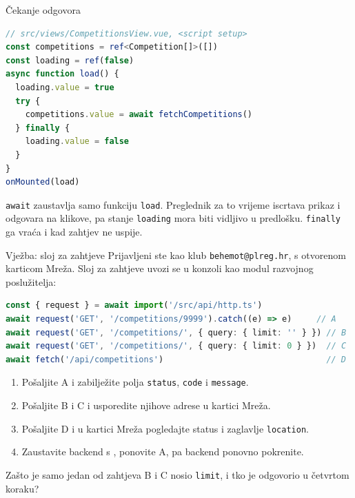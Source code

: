 \begin{frame}[fragile]{Čekanje odgovora}
\begin{lstlisting}[language=typescript]
// src/views/CompetitionsView.vue, <script setup>
const competitions = ref<Competition[]>([])
const loading = ref(false)
async function load() {
  loading.value = true
  try {
    competitions.value = await fetchCompetitions()
  } finally {
    loading.value = false
  }
}
onMounted(load)
\end{lstlisting}

\vspace{0.3em}
\texttt{await} zaustavlja samo funkciju \texttt{load}. Preglednik za to vrijeme iscrtava prikaz i odgovara na klikove, pa stanje \texttt{loading} mora biti vidljivo u predlošku. \texttt{finally} ga vraća i kad zahtjev ne uspije.
\end{frame}

\begin{frame}[fragile]{Vježba: sloj za zahtjeve}
Prijavljeni ste kao klub \texttt{behemot@plreg.hr}, s otvorenom karticom Mreža. Sloj za zahtjeve uvozi se u konzoli kao modul razvojnog poslužitelja:

\begin{lstlisting}[language=typescript]
const { request } = await import('/src/api/http.ts')
await request('GET', '/competitions/9999').catch((e) => e)     // A
await request('GET', '/competitions/', { query: { limit: '' } }) // B
await request('GET', '/competitions/', { query: { limit: 0 } })  // C
await fetch('/api/competitions')                                 // D
\end{lstlisting}

\begin{enumerate}
  \itemsep0.15em
  \item Pošaljite A i zabilježite polja \texttt{status}, \texttt{code} i \texttt{message}.
  \item Pošaljite B i C i usporedite njihove adrese u kartici Mreža.
  \item Pošaljite D i u kartici Mreža pogledajte status i zaglavlje \texttt{location}.
  \item Zaustavite backend s , ponovite A, pa backend ponovno pokrenite.
\end{enumerate}

\vspace{0.2em}
Zašto je samo jedan od zahtjeva B i C nosio \texttt{limit}, i tko je odgovorio u četvrtom koraku?
\end{frame}

